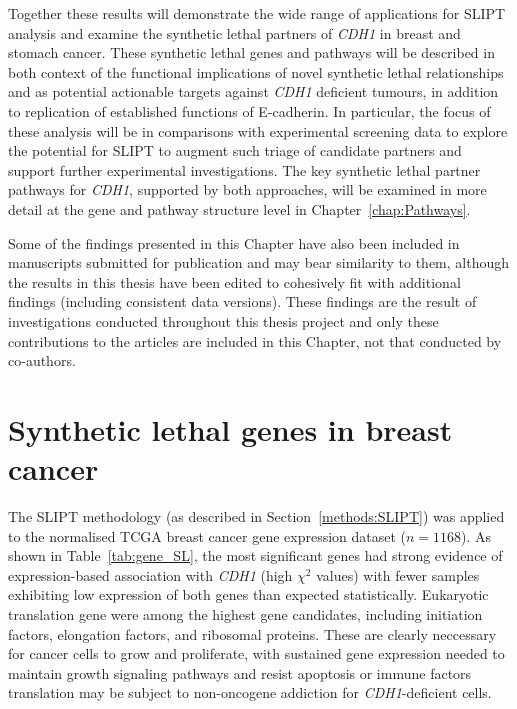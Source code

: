 Together these results will demonstrate the wide range of applications for \gls{SLIPT} analysis and examine the synthetic lethal partners of \textit{CDH1} in breast and stomach cancer. These synthetic lethal genes and pathways will be described in both context of the functional implications of novel synthetic lethal relationships and as potential actionable targets against \textit{CDH1} deficient tumours, in addition to replication of established functions of E-cadherin. In particular, the focus of these analysis will be in comparisons with experimental screening data to explore the potential for \gls{SLIPT} to augment such triage of candidate partners and support further experimental investigations. The key synthetic lethal partner pathways for \textit{CDH1}, supported by both approaches, will be examined in more detail at the gene and pathway structure level in Chapter~\ref{chap:Pathways}.

Some of the findings presented in this Chapter have also been included in manuscripts submitted for publication \citep{KellyHDGC, KellyBMC} and may bear similarity to them, although the results in this thesis have been edited to cohesively fit with additional findings (including consistent data versions). These findings are the result of investigations conducted throughout this thesis project and only these contributions to the articles are included in this Chapter, not that conducted by co-authors.

\section{Synthetic lethal genes in breast cancer} \label{chapt3:exprSL_genes}

The \gls{SLIPT} methodology (as described in Section~\ref{methods:SLIPT}) was applied to the normalised TCGA breast cancer gene expression dataset ($n = 1168$). As shown in Table~\ref{tab:gene_SL}, the most significant genes had strong evidence of expression-based association with \textit{CDH1} (high $\chi^2$ values) with fewer samples exhibiting low expression of both genes than expected statistically. Eukaryotic translation gene were among the highest gene candidates, including initiation factors, elongation factors, and ribosomal proteins. These are clearly neccessary for cancer cells to grow and proliferate, with sustained gene expression needed to maintain growth signaling pathways and resist apoptosis or immune factors translation may be subject to non-oncogene addiction for \textit{CDH1}-deficient cells.

